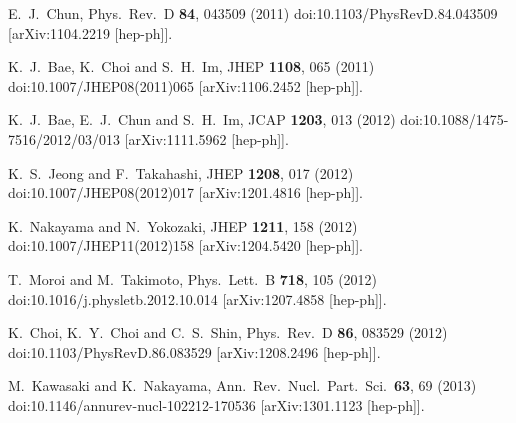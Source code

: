 \documentclass[12pt, a4paper]{article}
\begin{document}
\begin{thebibliography}{99}
  E.~J.~Chun,
  Phys.\ Rev.\ D {\bf 84}, 043509 (2011)
  doi:10.1103/PhysRevD.84.043509
  [arXiv:1104.2219 [hep-ph]].
  
  K.~J.~Bae, K.~Choi and S.~H.~Im,
  JHEP {\bf 1108}, 065 (2011)
  doi:10.1007/JHEP08(2011)065
  [arXiv:1106.2452 [hep-ph]].
  
  K.~J.~Bae, E.~J.~Chun and S.~H.~Im,
  JCAP {\bf 1203}, 013 (2012)
  doi:10.1088/1475-7516/2012/03/013
  [arXiv:1111.5962 [hep-ph]].
  
  K.~S.~Jeong and F.~Takahashi,
  JHEP {\bf 1208}, 017 (2012)
  doi:10.1007/JHEP08(2012)017
  [arXiv:1201.4816 [hep-ph]].
  
  K.~Nakayama and N.~Yokozaki,
  JHEP {\bf 1211}, 158 (2012)
  doi:10.1007/JHEP11(2012)158
  [arXiv:1204.5420 [hep-ph]].
  
  T.~Moroi and M.~Takimoto,
  Phys.\ Lett.\ B {\bf 718}, 105 (2012)
  doi:10.1016/j.physletb.2012.10.014
  [arXiv:1207.4858 [hep-ph]].
  
  K.~Choi, K.~Y.~Choi and C.~S.~Shin,
  Phys.\ Rev.\ D {\bf 86}, 083529 (2012)
  doi:10.1103/PhysRevD.86.083529
  [arXiv:1208.2496 [hep-ph]].
  
  M.~Kawasaki and K.~Nakayama,
  Ann.\ Rev.\ Nucl.\ Part.\ Sci.\  {\bf 63}, 69 (2013)
  doi:10.1146/annurev-nucl-102212-170536
  [arXiv:1301.1123 [hep-ph]].
  

\end{thebibliography}
\end{document}
